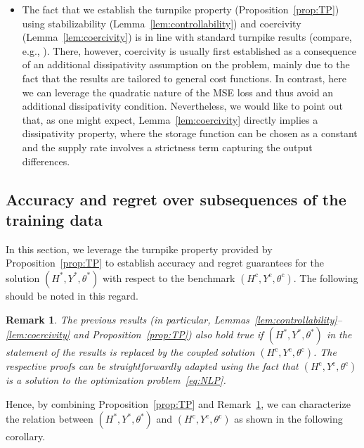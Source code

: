 \documentclass{article} %
\newtheorem{rem}{Remark}
\begin{document}
\begin{itemize}
	\item The fact that we establish the turnpike property (Proposition~\ref{prop:TP}) using stabilizability (Lemma~\ref{lem:controllability}) and coercivity (Lemma~\ref{lem:coercivity}) is in line with standard turnpike results (compare, e.g., \citet{Trelat2025,Trelat2018a,Gruene2016a}). There, however, coercivity is usually first established as a consequence of an additional dissipativity assumption on the problem, mainly due to the fact that the results are tailored to general cost functions.
	In contrast, here we can leverage the quadratic nature of the MSE loss and thus avoid an additional dissipativity condition. Nevertheless, we would like to point out that, as one might expect, Lemma~\ref{lem:coercivity} directly implies a dissipativity property, where the storage function can be chosen as a constant and the supply rate involves a strictness term capturing the output differences.
\end{itemize}

\subsection{Accuracy and regret over subsequences of the training data}\label{app:regret}

In this section, we leverage the turnpike property provided by Proposition~\ref{prop:TP} to establish accuracy and regret guarantees for the solution $(H^*,Y^*,\theta^*)$ with respect to the benchmark $(H^\mathrm{c},Y^\mathrm{c},\theta^\mathrm{c})$. The following should be noted in this regard.

\begin{rem}\label{rem:TP_coupled}
	The previous results (in particular, Lemmas~\ref{lem:controllability}--\ref{lem:coercivity} and Proposition~\ref{prop:TP}) also hold true if $(H^*,Y^*,\theta^*)$ in the statement of the results is replaced by the coupled solution $(H^\mathrm{c},Y^\mathrm{c},\theta^\mathrm{c})$. The respective proofs can be straightforwardly adapted using the fact that $(H^\mathrm{c},Y^\mathrm{c},\theta^\mathrm{c})$ is a solution to the optimization problem~\eqref{eq:NLP}.
\end{rem}

Hence, by combining Proposition~\ref{prop:TP} and Remark~\ref{rem:TP_coupled}, we can characterize the relation between $(H^*,Y^*,\theta^*)$ and $(H^\mathrm{c},Y^\mathrm{c},\theta^\mathrm{c})$ as shown in the following corollary.
\end{document}
